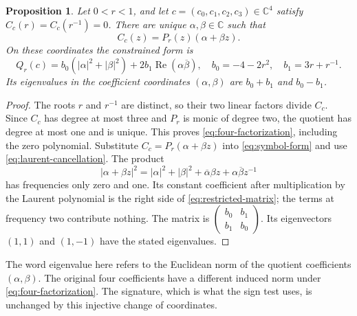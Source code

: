 \documentclass[11pt,letterpaper]{article}
\newtheorem{proposition}[theorem]{Proposition}
\theoremstyle{definition}
\theoremstyle{remark}
\newcommand{\C}{\mathbb C}
\begin{document}
\begin{proposition}
\label{prop:four-bump-signature}
Let $0<r<1$, and let $c=(c_0,c_1,c_2,c_3)\in\C^4$ satisfy
$C_c(r)=C_c(r^{-1})=0$. There are unique
$\alpha,\beta\in\C$ such that
\begin{equation}
 C_c(z)=P_r(z)(\alpha+\beta z).
 \label{eq:four-factorization}
\end{equation}
On these coordinates the constrained form is
\begin{equation}
 Q_r(c)=b_0(|\alpha|^2+|\beta|^2)
           +2b_1\operatorname{Re}(\alpha\overline\beta),
 \quad b_0=-4-2r^2,\quad b_1=3r+r^{-1}.
 \label{eq:restricted-matrix}
\end{equation}
Its eigenvalues in the coefficient coordinates
$(\alpha,\beta)$ are $b_0+b_1$ and $b_0-b_1$.
\end{proposition}
\begin{proof}
The roots $r$ and $r^{-1}$ are distinct, so their two
linear factors divide $C_c$. Since $C_c$ has degree at
most three and $P_r$ is monic of degree two, the quotient
has degree at most one and is unique. This proves
\eqref{eq:four-factorization}, including the zero polynomial.
Substitute $C_c=P_r(\alpha+\beta z)$ into
\eqref{eq:symbol-form} and use
\eqref{eq:laurent-cancellation}. The product
\[
 |\alpha+\beta z|^2=|\alpha|^2+|\beta|^2
 +\overline\alpha\beta z+\alpha\overline\beta z^{-1}
\]
has frequencies only zero and one. Its constant coefficient
after multiplication by the Laurent polynomial is the
right side of \eqref{eq:restricted-matrix}; the terms at
frequency two contribute nothing. The matrix is
$\left(\begin{smallmatrix}b_0&b_1\\b_1&b_0\end{smallmatrix}\right)$.
Its eigenvectors $(1,1)$ and $(1,-1)$ have the stated
eigenvalues.
\end{proof}

The word eigenvalue here refers to the Euclidean norm of
the quotient coefficients $(\alpha,\beta)$. The original
four coefficients have a different induced norm under
\eqref{eq:four-factorization}. The signature, which is what
the sign test uses, is unchanged by this injective change
of coordinates.
\end{document}
